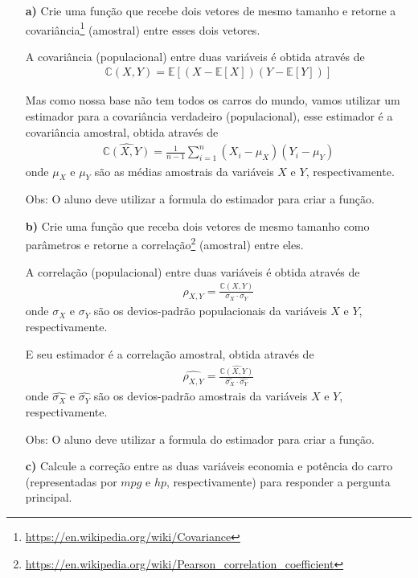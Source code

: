 \documentclass[12pt, a4paper]{article}
\begin{document}
\begin{itemize}
	\item[\textbf{a)}] Crie uma função que recebe dois vetores de mesmo tamanho e retorne a covariância\footnote{\url{https://en.wikipedia.org/wiki/Covariance}} (amostral) entre esses dois vetores.
	
	A covariância (populacional) entre duas variáveis é obtida através de
	\begin{align*}
		\mathbb{C}(X, Y) = \mathbb{E}\left[ (X - \mathbb{E}[X]) (Y - \mathbb{E}[Y]) \right]
	\end{align*}

	Mas como nossa base não tem todos os carros do mundo, vamos utilizar um estimador para a covariância verdadeiro (populacional), esse estimador é a covariância amostral, obtida através de
	\begin{align*}
		\widehat{\mathbb{C}(X, Y)} = \frac{1}{n-1} \sum_{i=1}^n (X_i - \mu_{X})(Y_i - \mu_{Y})
	\end{align*}
	onde $\mu_{X}$ e $\mu_{Y}$ são as médias amostrais da variáveis $X$ e $Y$, respectivamente.
	
	Obs: O aluno deve utilizar a formula do estimador para criar a função.
	
	\item[\textbf{b)}] Crie uma função que receba dois vetores de mesmo tamanho como parâmetros e retorne a correlação\footnote{\url{https://en.wikipedia.org/wiki/Pearson_correlation_coefficient}} (amostral) entre eles.
	
	A correlação (populacional) entre duas variáveis é obtida através de
	\begin{align*}
		\rho_{X, Y} = \frac{\mathbb{C}(X, Y)}{\sigma_X\cdot \sigma_Y}
	\end{align*}
	onde $\sigma_X$ e $\sigma_Y$ são os devios-padrão populacionais da variáveis $X$ e $Y$, respectivamente.
	
	E seu estimador é a correlação amostral, obtida através de
	\begin{align*}
		\widehat{\rho_{X, Y}} = \frac{\widehat{\mathbb{C}(X, Y)}}{\widehat{\sigma_X}\cdot \widehat{\sigma_Y}}
	\end{align*}
	onde $\widehat{\sigma_X}$ e $\widehat{\sigma_Y}$ são os devios-padrão amostrais da variáveis $X$ e $Y$, respectivamente.
	
	Obs: O aluno deve utilizar a formula do estimador para criar a função.
	
	\item[\textbf{c)}] Calcule a correção entre as duas variáveis economia e potência do carro (representadas por $mpg$ e $hp$, respectivamente) para responder a pergunta principal.
	
\end{itemize}
\end{document}
